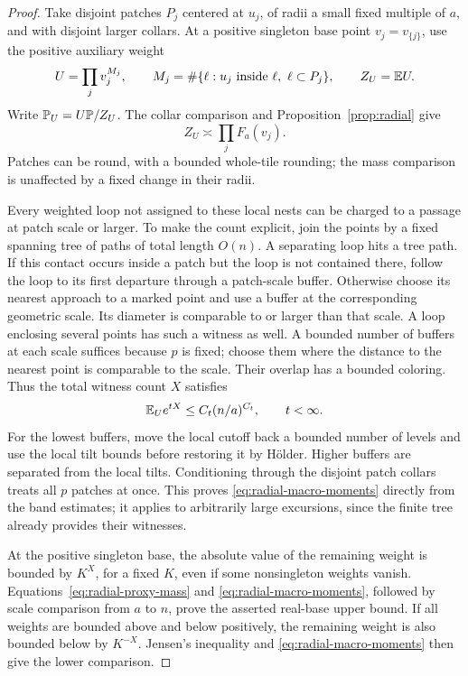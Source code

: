 \begin{proof}
Take disjoint patches $P_j$ centered at $u_j$, of radii a small fixed
multiple of $a$, and with disjoint larger collars. At a positive
singleton base point $v_j=v_{\{j\}}$, use the positive auxiliary
weight
\[
 U=\prod_j v_j^{M_j},
 \qquad M_j=\#\{\ell:u_j\text{ inside }\ell,\ \ell\subset P_j\},
 \qquad Z_U=\mathbb E U.
\]
Write $\mathbb P_U=U\mathbb P/Z_U$. The collar comparison and
Proposition~\ref{prop:radial} give
\begin{equation}\label{eq:radial-proxy-mass}
 Z_U\asymp\prod_jF_a(v_j).
\end{equation}
Patches can be round, with a bounded whole-tile rounding; the mass
comparison is unaffected by a fixed change in their radii.

Every weighted loop not assigned to these local nests can be charged
to a passage at patch scale or larger. To make the count explicit,
join the points by a fixed spanning tree of paths of total length
$O(n)$. A separating loop hits a tree path. If this contact occurs
inside a patch but the loop is not contained there, follow the loop
to its first departure through a patch-scale buffer. Otherwise choose
its nearest approach to a marked point and use a buffer at the
corresponding geometric scale. Its diameter is comparable to or
larger than that scale. A loop enclosing several points has such
a witness as well. A bounded number of buffers at each scale
suffices because $p$ is fixed; choose them where the distance to the
nearest point is comparable to the scale. Their overlap has a
bounded coloring. Thus the total witness count $X$ satisfies
\begin{equation}\label{eq:radial-macro-moments}
 \mathbb E_Ue^{tX}\le C_t(n/a)^{C_t},\qquad t<\infty.
\end{equation}
For the lowest buffers, move the local cutoff back a bounded number
of levels and use the local tilt bounds before restoring it by
H\"older. Higher buffers are separated from the local tilts.
Conditioning through the disjoint patch collars treats all $p$
patches at once. This proves \eqref{eq:radial-macro-moments} directly
from the band estimates; it applies to arbitrarily large excursions,
since the finite tree already provides their witnesses.

At the positive singleton base, the absolute value of the remaining
weight is bounded by $K^X$, for a fixed $K$, even if some nonsingleton
weights vanish. Equations~\eqref{eq:radial-proxy-mass} and
\eqref{eq:radial-macro-moments}, followed by scale comparison from
$a$ to $n$, prove the asserted real-base upper bound. If all weights
are bounded above and below positively, the remaining weight is
also bounded below by $K^{-X}$. Jensen's inequality and
\eqref{eq:radial-macro-moments} then give the lower comparison.


\end{proof}
